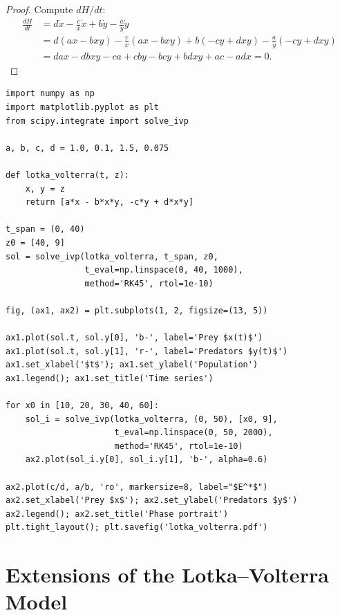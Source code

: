 \begin{proof}
Compute $dH/dt$:
\begin{align*}
  \frac{dH}{dt} &= d\dot{x} - \frac{c}{x}\dot{x}
                  + b\dot{y} - \frac{a}{y}\dot{y} \\
  &= d(ax-bxy) - \frac{c}{x}(ax-bxy)
   + b(-cy+dxy) - \frac{a}{y}(-cy+dxy) \\
  &= dax - dbxy - ca + cby - bcy + bdxy + ac - adx = 0.
\end{align*}
\end{proof}

\begin{codeblock}[title=\textbf{Lotka--Volterra simulation}]
\begin{verbatim}
import numpy as np
import matplotlib.pyplot as plt
from scipy.integrate import solve_ivp

a, b, c, d = 1.0, 0.1, 1.5, 0.075

def lotka_volterra(t, z):
    x, y = z
    return [a*x - b*x*y, -c*y + d*x*y]

t_span = (0, 40)
z0 = [40, 9]
sol = solve_ivp(lotka_volterra, t_span, z0,
                t_eval=np.linspace(0, 40, 1000),
                method='RK45', rtol=1e-10)

fig, (ax1, ax2) = plt.subplots(1, 2, figsize=(13, 5))

ax1.plot(sol.t, sol.y[0], 'b-', label='Prey $x(t)$')
ax1.plot(sol.t, sol.y[1], 'r-', label='Predators $y(t)$')
ax1.set_xlabel('$t$'); ax1.set_ylabel('Population')
ax1.legend(); ax1.set_title('Time series')

for x0 in [10, 20, 30, 40, 60]:
    sol_i = solve_ivp(lotka_volterra, (0, 50), [x0, 9],
                      t_eval=np.linspace(0, 50, 2000),
                      method='RK45', rtol=1e-10)
    ax2.plot(sol_i.y[0], sol_i.y[1], 'b-', alpha=0.6)

ax2.plot(c/d, a/b, 'ro', markersize=8, label="$E^*$")
ax2.set_xlabel('Prey $x$'); ax2.set_ylabel('Predators $y$')
ax2.legend(); ax2.set_title('Phase portrait')
plt.tight_layout(); plt.savefig('lotka_volterra.pdf')
\end{verbatim}
\end{codeblock}

\section{Extensions of the Lotka--Volterra Model}
\label{sec:extensions}

